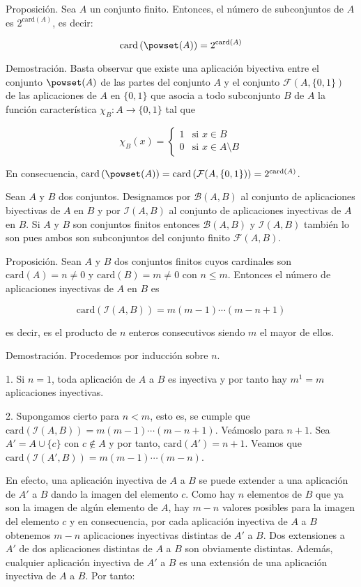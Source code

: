 Proposición. Sea $A$ un conjunto finito. Entonces, el número de subconjuntos
de $A$ es $2^{\text{card}(A)}$, es decir:

$$ \text{card} \left( \powset(A) \right) = 2^{\text{card}(A)} $$

Demostración. Basta observar que existe una aplicación biyectiva entre el
conjunto $\powset(A)$ de las partes del conjunto $A$ y el conjunto
$\mathcal{F}(A, \{0,1\})$ de las aplicaciones de $A$ en $\{0,1\}$ que asocia
a todo subconjunto $B$ de $A$ la función característica $\chi_B : A
\longrightarrow \{0,1\}$ tal que

$$
  \chi_B(x) =
  \begin{cases}
    1 & \text{si } x \in B \\
    0 & \text{si } x \in A \setminus B
  \end{cases}
$$

En consecuencia, $\text{card} \left( \powset(A) \right) = \text{card} \left(
\mathcal{F}(A, \{0,1\}) \right) = 2^{\text{card}(A)}$.

Sean $A$ y $B$ dos conjuntos. Designamos por $\mathcal{B}(A,B)$ al conjunto
de aplicaciones biyectivas de $A$ en $B$ y por $\mathcal{I}(A,B)$ al
conjunto de aplicaciones inyectivas de $A$ en $B$. Si $A$ y $B$ son
conjuntos finitos entonces $\mathcal{B}(A,B)$ y $\mathcal{I}(A,B)$ también
lo son pues ambos son subconjuntos del conjunto finito $\mathcal{F}(A,B)$.

Proposición. Sean $A$ y $B$ dos conjuntos finitos cuyos cardinales son
$\text{card}(A) = n \neq 0$ y $\text{card}(B) = m \neq 0$ con $n \leq m$.
Entonces el número de aplicaciones inyectivas de $A$ en $B$ es

$$ \text{card} \left( \mathcal{I}(A,B) \right) = m(m-1) \cdots (m-n+1) $$

\noindent es decir, es el producto de $n$ enteros consecutivos siendo $m$ el
mayor de ellos.

Demostración. Procedemos por inducción sobre $n$.

1. Si $n = 1$, toda aplicación de $A$ a $B$ es inyectiva y por tanto hay
$m^1 = m$ aplicaciones inyectivas.

2. Supongamos cierto para $n < m$, esto es, se cumple que $\text{card}
\left( \mathcal{I}(A,B) \right) = m(m-1)\cdots(m-n+1)$. Veámoslo para $n+1$.
Sea $A' = A \cup \{c\}$ con $c \notin A$ y por tanto, $\text{card}(A') =
n+1$. Veamos que $\text{card} \left( \mathcal{I}(A', B) \right) =
m(m-1)\cdots(m-n)$.

En efecto, una aplicación inyectiva de $A$ a $B$ se puede extender a una
aplicación de $A'$ a $B$ dando la imagen del elemento $c$. Como hay $n$
elementos de $B$ que ya son la imagen de algún elemento de $A$, hay $m-n$
valores posibles para la imagen del elemento $c$ y en consecuencia, por cada
aplicación inyectiva de $A$ a $B$ obtenemos $m-n$ aplicaciones inyectivas
distintas de $A'$ a $B$. Dos extensiones a $A'$ de dos aplicaciones
distintas de $A$ a $B$ son obviamente distintas. Además, cualquier
aplicación inyectiva de $A'$ a $B$ es una extensión de una aplicación
inyectiva de $A$ a $B$. Por tanto:

